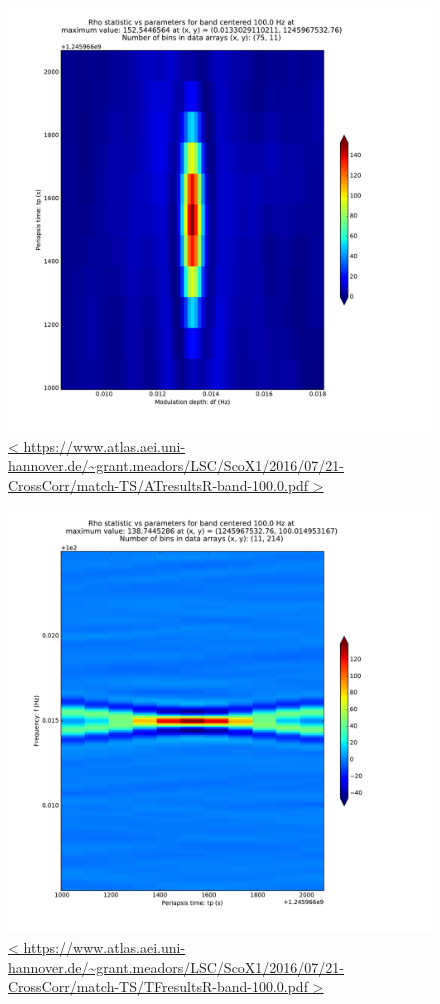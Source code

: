 \documentclass{article}
\begin{document}
\begin{figure}
\includegraphics[trim= 0 0 0 0, clip, width=0.40\paperwidth,keepaspectratio]{plots/match-TS/ATresultsR-band-100-0.pdf}
\caption{
\url{<
https://www.atlas.aei.uni-hannover.de/~grant.meadors/LSC/ScoX1/2016/07/21-CrossCorr/match-TS/ATresultsR-band-100.0.pdf
>}
}
\end{figure}

\begin{figure}
\includegraphics[trim= 0 0 0 0, clip, width=0.40\paperwidth,keepaspectratio]{plots/match-TS/TFresultsR-band-100-0.pdf}
\caption{
\url{<
https://www.atlas.aei.uni-hannover.de/~grant.meadors/LSC/ScoX1/2016/07/21-CrossCorr/match-TS/TFresultsR-band-100.0.pdf
>}
}
\end{figure}
\end{document}
